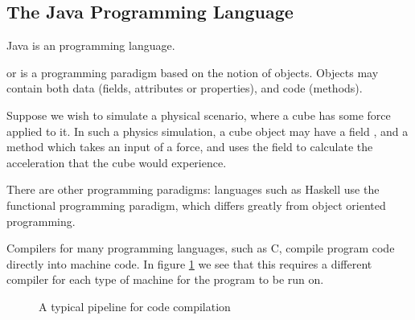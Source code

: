\documentclass[11pt]{article}
\begin{document}
\subsection{The Java Programming Language}
Java is an  programming language. 
\begin{defi} \label{def:OOP}
     or  is a programming paradigm based on the notion of objects. Objects may contain both data (fields, attributes or properties), and code (methods).
\end{defi}
\begin{eg}
    Suppose we wish to simulate a physical scenario, where a cube has some force applied to it. In such a physics simulation, a cube object may have a field , and a method  which takes an input of a force, and uses the  field to calculate the acceleration that the cube would experience.
\end{eg}
There are other programming paradigms: languages such as Haskell use the functional programming paradigm, which differs greatly from object oriented programming.
\par Compilers for many programming languages, such as C, compile program code directly into machine code. In figure \ref{fig:typicalCompilePipeline} we see that this requires a different compiler for each type of machine for the program to be run on.
\begin{figure}[H]
    \centering
    \caption{A typical pipeline for code compilation}
    \label{fig:typicalCompilePipeline}
    \vspace{10pt}
\end{figure}
\end{document}
